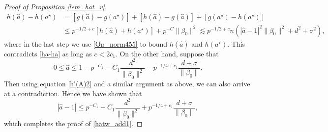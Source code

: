 \documentclass[aos,preprint]{imsart}
\begin{document}
\begin{proof}[Proof of Proposition \ref{lem_hat_v}]
\begin{align*}
	h(\hat{a}) - h(a^\star) &= [g(\hat{a}) - g(a^\star)] + [h(\hat{a}) - g(\hat{a})] + [g(a^\star) - h(a^\star)] \\
	&\le p^{-1/2+c}\left[ h(\hat a) +h(a^\star)\right]+ p^{-C}\|\beta_0\|^2 \lesssim p^{-1/2+c}n \left(|\hat a-1|^2\|\beta_0\|^2 + d^2 + \sigma^2 \right),
\end{align*}
where in the last step we use \eqref{Op_norm455} to bound  $ h(\hat a)$ and $h(a^\star)$. This contradicts \eqref{ha-ha} as long as $c<2c_1$. On the other hand, suppose that
 $$0\le \hat a\le 1 - p^{-C_1} - C_1\frac{d^2}{\|\beta_0\|^2} - p^{-1/4+c_1} \frac{d+\sigma}{\|\beta_0\|} .$$
Then using equation \eqref{h'(A)2} and a similar argument as above, we can also arrive at a contradiction. 
Hence we have shown that 
$$|\hat a -1| \le  p^{-C_1} + C_1\frac{d^2}{\|\beta_0\|^2} + p^{-1/4+c_1} \frac{d+\sigma}{\|\beta_0\|} ,$$
which completes the proof of \eqref{hatw_add1}.

\end{proof}
\end{document}
